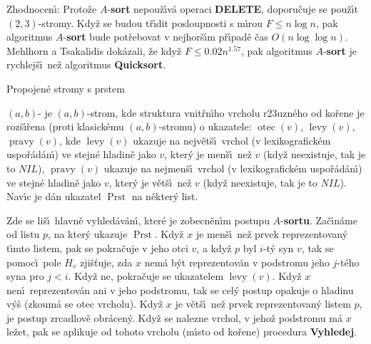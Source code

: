 \documentclass[a4paper,12pt]{article}
\def \emph#1{\underbar{#1}}
\DeclareMathOperator*{\otec}{otec}
\DeclareMathOperator*{\levy}{levy}
\DeclareMathOperator*{\pravy}{pravy}
\DeclareMathOperator*{\Prst}{Prst}
\begin{document}
\flushpar Zhodnocen\'\i : Proto\v ze $A$-{\bf sort} nepou\v z\'\i v\'a operaci 
{\bf DELETE}, doporu\v cuje se pou\v z\'\i t $(2,3)$-stromy. Kdy\v z se 
budou t\v r\'\i dit posloupnosti s m\'\i rou $F\le n\log n$, pak 
algoritmus $A$-{\bf sort} bude pot\v re\-bo\-vat v nejhor\v s\'\i m p\v r\'\i pad\v e 
\v cas $O(n\log\log n)$. Mehlhorn a Tsa\-kalidis dok\'azali, \v ze kdy\v z 
$F\le 0.02n^{1.57}$, pak algoritmus $A$-{\bf sort} je rychlej\v s\'\i\ ne\v z 
algoritmus {\bf Quicksort}.

\subhead
Propojen\'e stromy s prstem
\endsubhead

\flushpar\emph{Hladinov\v e} \emph{propojen\'y} $(a,b)$-\emph{strom} \emph{s} 
\emph{prstem} je $(a,b)$-strom, kde struktura vnit\v rn\'\i ho 
vrcholu r\accent23uzn\'eho od ko\v rene je 
roz\v s\'\i\v rena (proti klasick\'emu $(a,b)$-stromu) o 
ukazatele:\newline 
$\otec(v)$, $\levy(v)$, $\pravy(v)$, kde\newline 
$\levy(v)$ ukazuje na nejv\v et\v s\'\i\ vrchol (v lexikografic\-k\'em 
uspo\v r\'a\-d\'a\-n\'\i ) ve stejn\'e hladin\v e jako $v$, kter\'y je men\v s\'\i\ ne\v z 
$v$ (kdy\v z neexistuje, tak je to $NIL$),\newline 
$\pravy(v)$ ukazuje na nejmen\v s\'\i\ vrchol (v lexikografic\-k\'em 
uspo\v r\'a\-d\'a\-n\'\i ) ve stejn\'e hladin\v e jako $v$, kter\'y je v\v et\v s\'\i\ ne\v z 
$v$ (kdy\v z ne\-existuje, tak je to $NIL$).\newline 
Nav\'\i c je d\'an ukazatel 
$\Prst$ na n\v ekter\'y list. 
\medskip

\flushpar Zde se li\v s\'\i\ hlavn\v e vyhled\'av\'an\'\i , kter\'e je zobecn\v en\'\i m 
postupu $A$-{\bf sortu}. Za\v c\'\i n\'ame od listu $p$, na kter\'y ukazuje 
$\Prst$. Kdy\v z $x$ je men\v s\'\i\ ne\v z prvek reprezentovan\'y t\'\i mto 
listem, pak se pokra\v cuje v jeho otci $v$, a kdy\v z $p$ 
byl $i$-t\'y syn $v$, tak se pomoc\'\i\ pole $H_v$ zji\v s\v tuje, zda $
x$ 
nem\'a b\'yt reprezentov\'an v podstromu jeho $j$-t\'eho syna pro 
$j<i$. Kdy\v z ne, pokra\v cuje se  ukazatelem $\levy(v)$. 
Kdy\v z $x$ nen\'\i\ reprezentov\'an ani v jeho podstromu, 
tak se cel\'y postup opakuje o hladinu v\'y\v s (zkoum\'a se otec vrcholu). 
Kdy\v z $x$ je v\v et\v s\'\i\ ne\v z prvek reprezentovan\'y listem $
p$, 
je postup zrcadlov\v e obr\'acen\'y. Kdy\v z se nalezne 
vrchol, v jeho\v z podstromu m\'a $x$ le\v zet, pak se aplikuje od 
tohoto vrcholu (m\'\i sto od ko\v rene) procedura {\bf Vyhledej}.
\newpage
\end{document}
